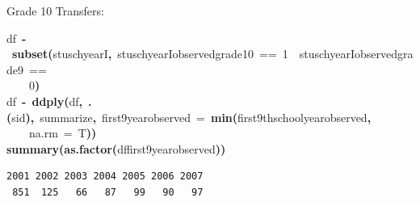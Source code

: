 \documentclass[12pt]{article}
\makeatletter
\newcommand{\hlnumber}[1]{\textcolor[rgb]{0,0,0}{#1}}%
\newcommand{\hlfunctioncall}[1]{\textcolor[rgb]{0.501960784313725,0,0.329411764705882}{\textbf{#1}}}%
\newcommand{\hlkeyword}[1]{\textcolor[rgb]{0,0,0}{\textbf{#1}}}%
\newcommand{\hlargument}[1]{\textcolor[rgb]{0.690196078431373,0.250980392156863,0.0196078431372549}{#1}}%
\newcommand{\hlassignement}[1]{\textcolor[rgb]{0,0,0}{\textbf{#1}}}%
\newcommand{\hlsymbol}[1]{\textcolor[rgb]{0,0,0}{#1}}%
\newcommand{\hlstd}[1]{\textcolor[rgb]{0,0,0}{#1}}%
\newenvironment{kframe}{%
 \def\FrameCommand##1{\hskip\@totalleftmargin \hskip-\fboxsep
 \colorbox{shadecolor}{##1}\hskip-\fboxsep
     \hskip-\linewidth \hskip-\@totalleftmargin \hskip\columnwidth}%
 \MakeFramed {\advance\hsize-\width
   \@totalleftmargin\z@ \linewidth\hsize
   \@setminipage}}%
 {\par\unskip\endMakeFramed}
\newenvironment{knitrout}{}{} %
\renewenvironment{knitrout}{\begin{footnotesize}}{\end{footnotesize}}
\makeatother
\begin{document}
Grade 10 Transfers:
\begin{knitrout}
\color{fgcolor}\begin{kframe}
\begin{flushleft}
\ttfamily\noindent
\hlsymbol{df}{\ }\hlassignement{\usebox{\hlnormalsizeboxlessthan}-}{\ }\hlfunctioncall{subset}\hlkeyword{(}\hlsymbol{stuschyearI}\hlkeyword{,}{\ }\hlsymbol{stuschyearI}\hlkeyword{\usebox{\hlnormalsizeboxdollar}}\hlsymbol{observed\usebox{\hlnormalsizeboxunderscore}grade\usebox{\hlnormalsizeboxunderscore}10}{\ }=={\ }\hlnumber{1}{\ }\hlkeyword{\usebox{\hlnormalsizeboxand}}{\ }\hlsymbol{stuschyearI}\hlkeyword{\usebox{\hlnormalsizeboxdollar}}\hlsymbol{observed\usebox{\hlnormalsizeboxunderscore}grade\usebox{\hlnormalsizeboxunderscore}9}{\ }==\hspace*{\fill}\\
\hlstd{}{\ }{\ }{\ }{\ }\hlnumber{0}\hlkeyword{)}\hspace*{\fill}\\
\hlstd{}\hlsymbol{df}{\ }\hlassignement{\usebox{\hlnormalsizeboxlessthan}-}{\ }\hlfunctioncall{ddply}\hlkeyword{(}\hlsymbol{df}\hlkeyword{,}{\ }\hlfunctioncall{.}\hlkeyword{(}\hlsymbol{sid}\hlkeyword{)}\hlkeyword{,}{\ }\hlsymbol{summarize}\hlkeyword{,}{\ }\hlargument{first9yearobserved}{\ }\hlargument{=}{\ }\hlfunctioncall{min}\hlkeyword{(}\hlsymbol{first9thschoolyear\usebox{\hlnormalsizeboxunderscore}observed}\hlkeyword{,}\hspace*{\fill}\\
\hlstd{}{\ }{\ }{\ }{\ }\hlargument{na.rm}{\ }\hlargument{=}{\ }\hlsymbol{T}\hlkeyword{)}\hlkeyword{)}\hspace*{\fill}\\
\hlstd{}\hlfunctioncall{summary}\hlkeyword{(}\hlfunctioncall{as.factor}\hlkeyword{(}\hlsymbol{df}\hlkeyword{\usebox{\hlnormalsizeboxdollar}}\hlsymbol{first9yearobserved}\hlkeyword{)}\hlkeyword{)}\mbox{}
\normalfont
\end{flushleft}
\begin{verbatim}
2001 2002 2003 2004 2005 2006 2007 
 851  125   66   87   99   90   97 
\end{verbatim}
\end{kframe}
\end{knitrout}
\end{document}
